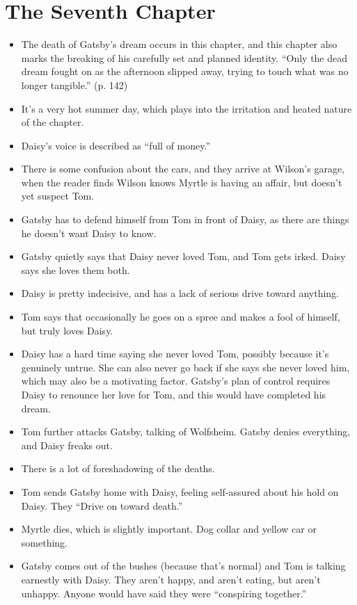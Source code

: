 \documentclass[12pt]{article}
\begin{document}
\section{The Seventh Chapter}
\begin{itemize}
	\item The death of Gatsby's dream occurs in this chapter, and this 
		chapter also marks the breaking of his carefully set and 
		planned identity.  ``Only the dead dream fought on as the 
		afternoon slipped away, trying to touch what was no longer 
		tangible.'' (p. 142)
	\item It's a very hot summer day, which plays into the irritation and 
		heated nature of the chapter.
	\item Daisy's voice is described as ``full of money.''  
	\item There is some confusion about the cars, and they arrive at 
		Wilson's garage, when the reader finds Wilson knows Myrtle is 
		having an affair, but doesn't yet suspect Tom.
	\item Gatsby has to defend himself from Tom in front of Daisy, as 
		there are things he doesn't want Daisy to know.
	\item Gatsby quietly says that Daisy never loved Tom, and Tom gets 
		irked.  Daisy says she loves them both.  
	\item Daisy is pretty indecisive, and has a lack of serious drive 
		toward anything.  
	\item Tom says that occasionally he goes on a spree and makes a fool 
		of himself, but truly loves Daisy.
	\item Daisy has a hard time saying she never loved Tom, possibly 
		because it's genuinely untrue.  She can also never go back if 
		she says she never loved him, which may also be a motivating 
		factor.  Gatsby's plan of control requires Daisy to renounce 
		her love for Tom, and this would have completed his dream.
	\item Tom further attacks Gatsby, talking of Wolfsheim.  Gatsby denies 
		everything, and Daisy freaks out.
	\item There is a lot of foreshadowing of the deaths.
	\item Tom sends Gatsby home with Daisy, feeling self-assured about his 
		hold on Daisy.  They ``Drive on toward death.''
	\item Myrtle dies, which is slightly important.  Dog collar and yellow 
		car or something.  
	\item Gatsby comes out of the bushes (because that's normal) and Tom 
		is talking earnestly with Daisy.  They aren't happy, and 
		aren't eating, but aren't unhappy.  Anyone would have said 
		they were ``conspiring together.''
\end{itemize}
\end{document}
